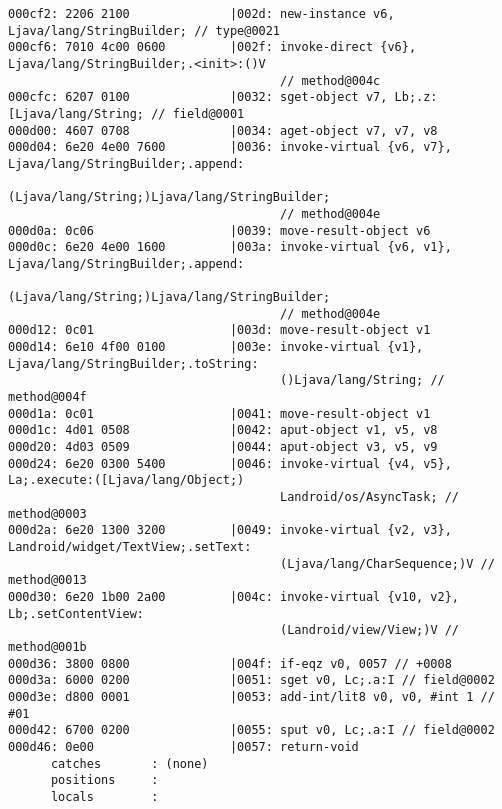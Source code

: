 \begin{lstlisting}
000cf2: 2206 2100              |002d: new-instance v6, Ljava/lang/StringBuilder; // type@0021
000cf6: 7010 4c00 0600         |002f: invoke-direct {v6}, Ljava/lang/StringBuilder;.<init>:()V
                                      // method@004c
000cfc: 6207 0100              |0032: sget-object v7, Lb;.z:[Ljava/lang/String; // field@0001
000d00: 4607 0708              |0034: aget-object v7, v7, v8
000d04: 6e20 4e00 7600         |0036: invoke-virtual {v6, v7}, Ljava/lang/StringBuilder;.append:
                                      (Ljava/lang/String;)Ljava/lang/StringBuilder;
                                      // method@004e
000d0a: 0c06                   |0039: move-result-object v6
000d0c: 6e20 4e00 1600         |003a: invoke-virtual {v6, v1}, Ljava/lang/StringBuilder;.append:
                                      (Ljava/lang/String;)Ljava/lang/StringBuilder;
                                      // method@004e
000d12: 0c01                   |003d: move-result-object v1
000d14: 6e10 4f00 0100         |003e: invoke-virtual {v1}, Ljava/lang/StringBuilder;.toString:
                                      ()Ljava/lang/String; // method@004f
000d1a: 0c01                   |0041: move-result-object v1
000d1c: 4d01 0508              |0042: aput-object v1, v5, v8
000d20: 4d03 0509              |0044: aput-object v3, v5, v9
000d24: 6e20 0300 5400         |0046: invoke-virtual {v4, v5}, La;.execute:([Ljava/lang/Object;)
                                      Landroid/os/AsyncTask; // method@0003
000d2a: 6e20 1300 3200         |0049: invoke-virtual {v2, v3}, Landroid/widget/TextView;.setText:
                                      (Ljava/lang/CharSequence;)V // method@0013
000d30: 6e20 1b00 2a00         |004c: invoke-virtual {v10, v2}, Lb;.setContentView:
                                      (Landroid/view/View;)V // method@001b
000d36: 3800 0800              |004f: if-eqz v0, 0057 // +0008
000d3a: 6000 0200              |0051: sget v0, Lc;.a:I // field@0002
000d3e: d800 0001              |0053: add-int/lit8 v0, v0, #int 1 // #01
000d42: 6700 0200              |0055: sput v0, Lc;.a:I // field@0002
000d46: 0e00                   |0057: return-void
      catches       : (none)
      positions     :
      locals        :


\end{lstlisting}
